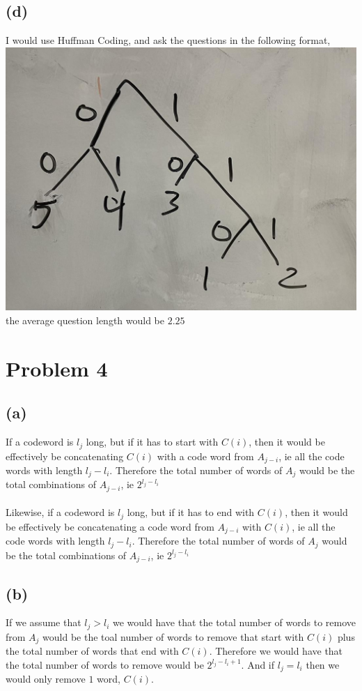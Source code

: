 \subsection*{(d)}
I would use Huffman Coding, and ask the questions in the following format,\\
\includegraphics[scale=0.25]{fig0.jpg}\\
the average question length would be $\boxed{2.25}$
\section*{Problem 4}
\subsection*{(a)}
If a codeword is $l_j$ long, but if it has to start with $C(i)$, then it would be effectively be
concatenating $C(i)$ with a code word from $A_{j-i}$, ie all the code words with length $l_j-l_i$. Therefore the total number of words 
of $A_j$ would be the total combinations of $A_{j-i}$, ie $2^{l_j-l_i}$\\\\
Likewise, if a codeword is $l_j$ long, but if it has to end with $C(i)$, then it would be effectively be
concatenating a code word from $A_{j-i}$ with $C(i)$, ie all the code words with length $l_j-l_i$. Therefore the total number of words 
of $A_j$ would be the total combinations of $A_{j-i}$, ie $2^{l_j-l_i}$
\subsection*{(b)}
If we assume that $l_j>l_i$ we would have that the total number of words to remove from $A_j$ would
be the toal number of words to remove that start with $C(i)$ plus the total number of words that end with
$C(i)$. Therefore we would have that the total number of words to remove would be $2^{l_j-l_i+1}$. 
And if $l_j=l_i$ then we would only remove $1$ word, $C(i)$.
